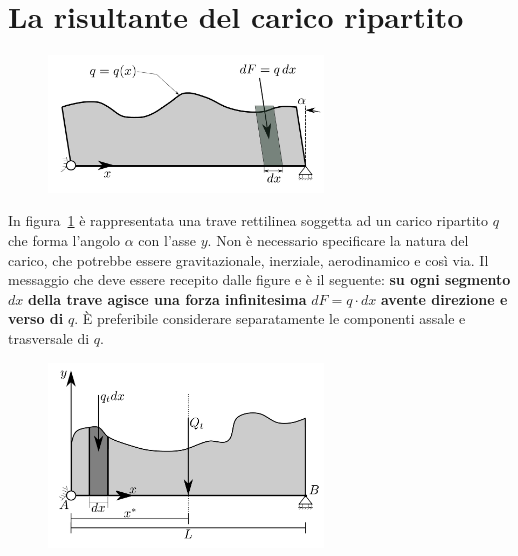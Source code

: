\section{La risultante del carico ripartito}
\renewcommand{\thefigure}{10~-~3}
\begin{figure}[ht]
\centering
\includegraphics[width=0.65\textwidth]{Immagini/Parte_10/Figura10_3/figura10_3.pdf}
\caption{}
\label{figura10-3}
\end{figure}
In figura~\ref{figura10-3} è rappresentata una trave rettilinea soggetta ad un carico ripartito $q$ che forma l'angolo $\alpha$ con l'asse $y$. Non è necessario specificare la natura del carico, che potrebbe essere gravitazionale, inerziale, aerodinamico e così via. Il messaggio che deve essere recepito dalle figure e è il seguente: \textbf{su ogni segmento} $dx$ \textbf{della trave agisce una forza infinitesima} $dF = q\cdot dx$ \textbf{avente direzione e verso di} $q$. È preferibile considerare separatamente le componenti assale e trasversale di $q$.
\renewcommand{\thefigure}{10~-~4}
\begin{figure}[ht]
\centering
\includegraphics[width=0.65\textwidth]{Immagini/Parte_10/Figura10_4/figura10_4.pdf}
\caption{}
\label{figura10-4}
\end{figure}
